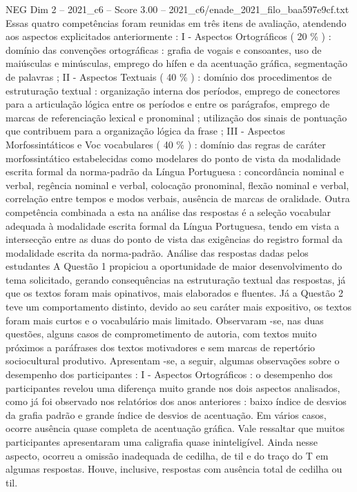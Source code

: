 \begin{textsample}{NEG Dim 2 – 2021\_c6 – Score 3.00 – 2021\_c6/enade\_2021\_filo\_baa597e9cf.txt}
Essas quatro competências foram reunidas em três itens de avaliação, atendendo aos aspectos explicitados anteriormente : I - Aspectos Ortográficos ( 20 \% ) : domínio das convenções ortográficas : grafia de vogais e consoantes, uso de maiúsculas e minúsculas, emprego do hífen e da acentuação gráfica, segmentação de palavras ; II - Aspectos Textuais ( 40 \% ) : domínio dos procedimentos de estruturação textual : organização interna dos períodos, emprego de conectores para a articulação lógica entre os períodos e entre os parágrafos, emprego de marcas de referenciação lexical e pronominal ; utilização dos sinais de pontuação que contribuem para a organização lógica da frase ; III - Aspectos Morfossintáticos e Voc vocabulares ( 40 \% ) : domínio das regras de caráter morfossintático estabelecidas como modelares do ponto de vista da modalidade escrita formal da norma-padrão da Língua Portuguesa : concordância nominal e verbal, regência nominal e verbal, colocação pronominal, flexão nominal e verbal, correlação entre tempos e modos verbais, ausência de marcas de oralidade.
Outra competência combinada a esta na análise das respostas é a seleção vocabular adequada à modalidade escrita formal da Língua Portuguesa, tendo em vista a intersecção entre as duas do ponto de vista das exigências do registro formal da modalidade escrita da norma-padrão.
Análise das respostas dadas pelos estudantes A Questão 1 propiciou a oportunidade de maior desenvolvimento do tema solicitado, gerando consequências na estruturação textual das respostas, já que os textos foram mais opinativos, mais elaborados e fluentes.
Já a Questão 2 teve um comportamento distinto, devido ao seu caráter mais expositivo, os textos foram mais curtos e o vocabulário mais limitado.
Observaram -se, nas duas questões, alguns casos de comprometimento de autoria, com textos muito próximos a paráfrases dos textos motivadores e sem marcas de repertório sociocultural produtivo.
Apresentam -se, a seguir, algumas observações sobre o desempenho dos participantes : I - Aspectos Ortográficos : o desempenho dos participantes revelou uma diferença muito grande nos dois aspectos analisados, como já foi observado nos relatórios dos anos anteriores : baixo índice de desvios da grafia padrão e grande índice de desvios de acentuação.
Em vários casos, ocorre ausência quase completa de acentuação gráfica.
Vale ressaltar que muitos participantes apresentaram uma caligrafia quase ininteligível.
Ainda nesse aspecto, ocorreu a omissão inadequada de cedilha, de til e do traço do T em algumas respostas.
Houve, inclusive, respostas com ausência total de cedilha ou til.

\end{textsample}
